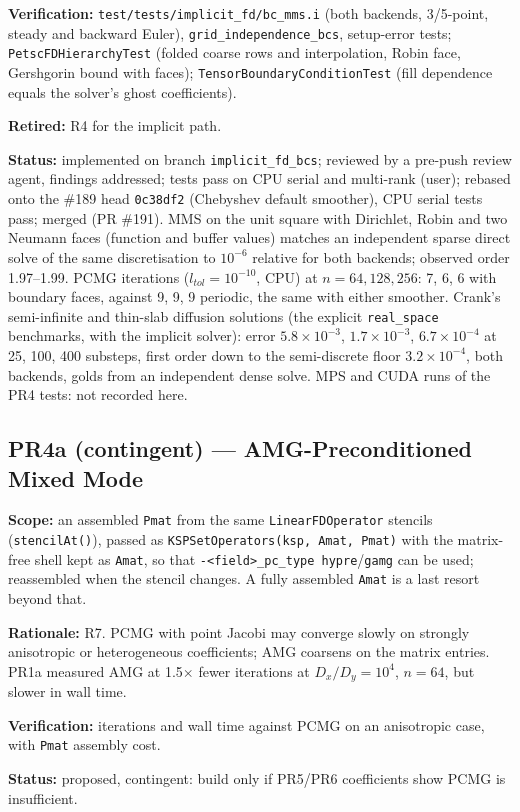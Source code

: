 \documentclass[11pt]{article}
\newcommand{\pr}[2]{\subsection{PR#1 --- #2}}
\newcommand{\status}[1]{\textcolor{marlinteal}{\textbf{Status:}} #1}
\begin{document}
\textbf{Verification:} \texttt{test/tests/implicit\_fd/bc\_mms.i} (both
backends, 3/5-point, steady and backward Euler),
\texttt{grid\_independence\_bcs}, setup-error tests;
\texttt{PetscFDHierarchyTest} (folded coarse rows and interpolation, Robin
face, Gershgorin bound with faces); \texttt{TensorBoundaryConditionTest}
(fill dependence equals the solver's ghost coefficients).

\textbf{Retired:} R4 for the implicit path.

\status{implemented on branch \texttt{implicit\_fd\_bcs}; reviewed by a pre-push review agent,
findings addressed; tests pass on CPU serial and multi-rank (user); rebased onto the
\#189 head \texttt{0c38df2} (Chebyshev default smoother), CPU serial tests pass; merged (PR \#191). MMS on the unit square with Dirichlet, Robin and two Neumann faces (function and
buffer values) matches an independent sparse direct solve of the same discretisation to
$10^{-6}$ relative for both backends; observed order 1.97--1.99. PCMG iterations
($l_{tol}=10^{-10}$, CPU) at $n = 64, 128, 256$: 7, 6, 6 with boundary faces, against 9, 9, 9
periodic, the same with either smoother. Crank's semi-infinite and thin-slab diffusion
solutions (the explicit \texttt{real\_space} benchmarks, with the implicit solver): error
$5.8\times10^{-3}$, $1.7\times10^{-3}$, $6.7\times10^{-4}$ at 25, 100, 400 substeps, first order
down to the semi-discrete floor $3.2\times10^{-4}$, both backends, golds from an independent
dense solve. MPS and CUDA runs of the PR4 tests: not recorded here.}

\pr{4a (contingent)}{AMG-Preconditioned Mixed Mode}
\textbf{Scope:} an assembled \texttt{Pmat} from the same
\texttt{LinearFDOperator} stencils (\texttt{stencilAt()}), passed as
\texttt{KSPSetOperators(ksp, Amat, Pmat)} with the matrix-free shell kept as
\texttt{Amat}, so that \texttt{-<field>\_pc\_type hypre}/\texttt{gamg} can
be used; reassembled when the stencil changes. A fully assembled
\texttt{Amat} is a last resort beyond that.

\textbf{Rationale:} R7. PCMG with point Jacobi may converge slowly on
strongly anisotropic or heterogeneous coefficients; AMG coarsens on the
matrix entries. PR1a measured AMG at 1.5$\times$ fewer iterations at
$D_x/D_y = 10^4$, $n=64$, but slower in wall time.

\textbf{Verification:} iterations and wall time against PCMG on an
anisotropic case, with \texttt{Pmat} assembly cost.

\status{proposed, contingent: build only if PR5/PR6 coefficients show PCMG
is insufficient.}
\end{document}
